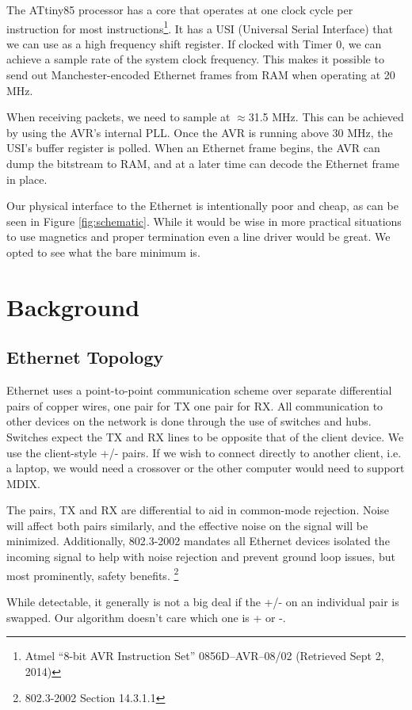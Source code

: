 \documentclass[13pt]{ltxdoc}
\begin{document}
The ATtiny85 processor has a core that operates at one clock cycle per instruction
for most instructions\footnote{Atmel ``8-bit AVR Instruction Set'' 0856D–AVR–08/02 (Retrieved Sept 2, 2014)}.  It has a USI (Universal Serial Interface)
that we can use as a high frequency shift register.  If clocked with Timer 0, 
we can achieve a sample rate of the system clock frequency.  This makes it possible
to send out Manchester-encoded Ethernet frames from RAM when operating at 20 MHz. 

When receiving packets, we need to sample at $\approx$31.5 MHz.  This can be achieved
by using the AVR's internal PLL.  Once the AVR is running above 30 MHz, the USI's 
buffer register is polled.  When an Ethernet frame begins, the AVR can dump the 
bitstream to RAM, and at a later time can decode the Ethernet frame in place.

Our physical interface to the Ethernet is intentionally poor and cheap, as can be seen in
Figure \ref{fig:schematic}.  While
it would be wise in more practical situations to use magnetics and proper termination
even a line driver would be great.  We opted to see what the bare minimum is.

\section{Background}

\subsection{Ethernet Topology}
Ethernet uses a point-to-point communication scheme over separate differential pairs of copper wires, one pair for TX one pair for RX. 
All communication to other devices on the network
is done through the use of switches and hubs.  Switches expect the TX and RX lines to
be opposite that of the client device.  We use the client-style +/- pairs.  If we wish
to connect directly to another client, i.e. a laptop, we would need a crossover or the
other computer would need to support MDIX.

The pairs, TX and RX are differential to aid in common-mode rejection.  Noise
will affect both pairs similarly, and the effective noise on the signal will be minimized.
Additionally, 802.3-2002 mandates all Ethernet devices isolated
the incoming signal to help with noise rejection and prevent ground loop issues, but
most prominently, safety benefits.  \footnote{802.3-2002 Section 14.3.1.1}

While detectable, it generally is not a big deal if the +/- on an individual pair
is swapped.  Our algorithm doesn't care which one is + or -.
\end{document}
